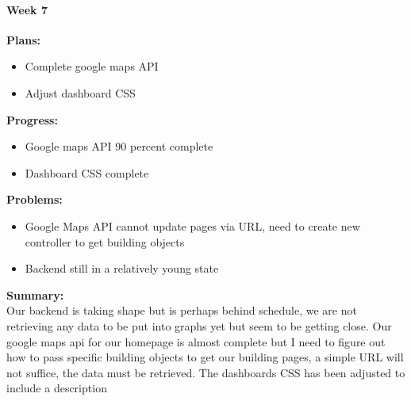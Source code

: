 \paragraph{Week 7}
\begin{adjustwidth}{2.5em}{0pt}
    \vspace{-0.5cm}\textbf{Plans:}
    \vspace{-0.5cm}
    \begin{itemize}
        \item Complete google maps API
        \item Adjust dashboard CSS
    \end{itemize} 
    \vspace{-0.3cm}\textbf{Progress:}
    \vspace{-0.5cm}
    \begin{itemize}
        \item Google maps API 90 percent complete
		\item Dashboard CSS complete
    \end{itemize} 
    \vspace{-0.3cm}\textbf{Problems:}
    \vspace{-0.5cm}
    \begin{itemize}
        \item Google Maps API cannot update pages via URL, need to create new controller to get building objects
        \item Backend still in a relatively young state
    \end{itemize}  
    \vspace{-0.3cm}\noindent\textbf{Summary:}\\
    \noindent Our backend is taking shape but is perhaps behind schedule, we are not retrieving any data to be put into graphs yet but seem to be getting close. Our google maps api for our homepage is almost complete but I need to figure out how to pass specific  building objects to get our building pages, a simple URL will not suffice, the data must be retrieved. The dashboards CSS has been adjusted to include a description
	\end{adjustwidth} 
